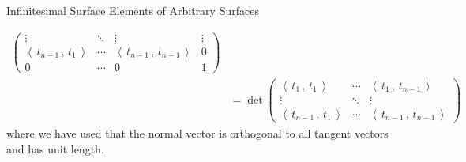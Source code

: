 \documentclass[smaller,hyperref={CJKbookmarks=true}]{beamer}
\newcommand{\scp}[2]{\left\langle\,#1\,,\,#2\,\right\rangle} \newcommand{\scpp}{\langle\,\cdot\,,\,\cdot\,\rangle}
\begin{document}
\begin{frame}{Infinitesimal Surface Elements of Arbitrary Surfaces}
\begin{spacing}{0.9}
\begin{equation*}
\begin{split}
\begin{pmatrix}
             \vdots & \ddots
             & \vdots & \vdots \\
              \scp{t_{n-1}}{t_1} & \cdots & \scp{t_{n-1}}{t_{n-1}} & 0 \\
              0& \cdots & 0 & 1
           \end{pmatrix} \\
       &=\det\begin{pmatrix}
               \scp{t_1}{t_1} & \cdots & \scp{t_1}{t_{n-1}} \\
               \vdots
                & \ddots & \vdots \\
               \scp{t_{n-1}}{t_1} & \cdots & \scp{t_{n-1}}{t_{n-1}}
             \end{pmatrix}
  \end{split}
\end{equation*}
where we have used that the normal vector is orthogonal to all tangent
vectors and has unit length.
\end{spacing}
\end{frame}
\end{document}
